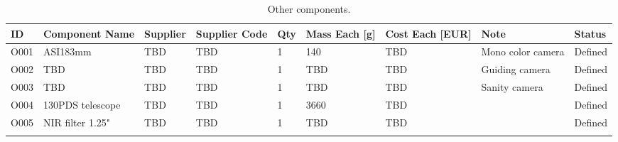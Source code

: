 

\begin{longtable}{|m{}|m{}|m{}|m{}|m{}|m{}|m{}|m{}|m{}|}

\hline
\textbf{ID} & \textbf{Component Name} & \textbf{Supplier} & \textbf{Supplier Code} & \textbf{Qty} & \textbf{Mass Each [g]} & \textbf{Cost Each [EUR]} & \textbf{Note} & \textbf{Status} \\ \hline

O001 & ASI183mm					& TBD 	& TBD 	& 1 & 140 	& TBD & Mono color camera & Defined \\\hline
O002 & TBD 						& TBD 	& TBD 	& 1 & TBD 	& TBD & Guiding camera & Defined \\\hline
O003 & TBD 						& TBD 	& TBD 	& 1 & TBD 	& TBD & Sanity camera & Defined \\\hline
O004 & 130PDS telescope 		& TBD 	& TBD 	& 1 & 3660 	& TBD & & Defined \\\hline
O005 & NIR filter 1.25" 		& TBD 	& TBD 	& 1 & TBD 	& TBD & & Defined \\\hline



\caption{Other components.}
\label{tab:component-other}
\end{longtable}
\raggedbottom